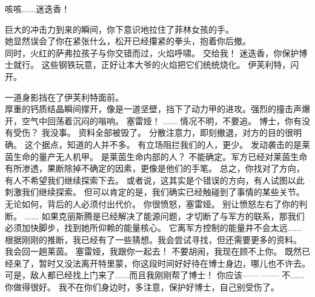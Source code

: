 \documentclass[openany]{book}
\begin{document}
\begin{dialogue}
     咳咳......迷迭香！\par
    巨大的冲击力到来的瞬间，你下意识地拉住了菲林女孩的手。\\
    她显然误会了你在紧张什么，松开已经攥紧的拳头，抱着你后撤。\\
    同时，火红的萨弗拉孩子与你交错而过，火焰呼啸。
     交给我！
     迷迭香，你保护博士就行。
     这些钢铁玩意，正好让本大爷的火焰把它们统统烧化。
     伊芙利特，闪开。\par
    一道身影挡在了伊芙利特面前。\\
    厚重的钙质结晶瞬间撑开，像是一道坚壁，挡下了动力甲的进攻。强烈的撞击声爆开，空气中回荡着沉闷的嗡响。
     塞雷娅！
     ......
     情况不明，不要追。
     博士，你有没有受伤？
     我没事。
     资料全部被毁了。
     分散注意力，即刻撤退，对方的目的很明确。
     这个据点，知道的人并不多。
     有立场阻拦我们的人，更少。
     发动袭击的是莱茵生命的量产无人机甲。
     是莱茵生命内部的人？
     不能确定。军方已经对莱茵生命有所渗透，果断除掉不确定的因素，更像是他们的手笔。
     总之，你找对了方向，有人不希望我们继续探索下去。
     或者说，这其实是个错误的方向，有人试图以此刺激我们继续探索。
     但可以肯定的是，我们确实已经触碰到了事情的某些关节。
     无论如何，背后的人必须付出代价。
     你很愤怒，塞雷娅。
     别让愤怒左右了你的判断。
     ......
     如果克丽斯腾是已经解决了能源问题，才切断了与军方的联系，那我们必须加快脚步，找到她所仰赖的能量核心。
     它离军方控制的能量井不会太远......
     根据刚刚的推断，我已经有了一些猜想。我会尝试寻找，但还需要更多的资料。
     我会回一趟莱茵。
     塞雷娅，我跟你一起去！
     不要胡闹，我现在顾不上你。
     既然已经来了，暂时又没法离开特里蒙，你这段时间好好待在博士身边，哪儿也不许去。
     可是，敌人都已经找上门来了......而且我刚刚帮了博士！
     你应该——
     ——
     不......你做得很好。
     我不在你们身边时，多注意，保护好博士，自己别受伤了。
\end{dialogue}
\end{document}
